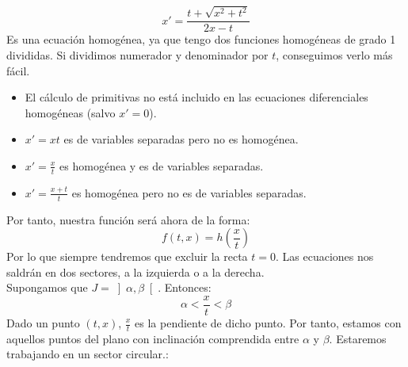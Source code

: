 \begin{ejemplo}
    \begin{equation*}
        x' = \dfrac{t + \sqrt{x^2+t^2}}{2x-t}
    \end{equation*}
    Es una ecuación homogénea, ya que tengo dos funciones homogéneas de grado 1 divididas. Si dividimos numerador y denominador por $t$, conseguimos verlo más fácil.
\end{ejemplo}

\begin{itemize}
    \item El cálculo de primitivas no está incluido en las ecuaciones diferenciales homogéneas (salvo $x' = 0$).
    \item $x' = xt$ es de variables separadas pero no es homogénea.
    \item $x' = \frac{x}{t}$ es homogénea y es de variables separadas.
    \item $x' = \frac{x+t}{t}$ es homogénea pero no es de variables separadas.
\end{itemize}


Por tanto, nuestra función será ahora de la forma:
\begin{equation*}
    f(t,x) = h\left(\dfrac{x}{t}\right)
\end{equation*}
Por lo que siempre tendremos que excluir la recta $t=0$. Las ecuaciones nos saldrán en dos sectores, a la izquierda o a la derecha.\\

Supongamos que $J = \left]\alpha, \beta\right[$. Entonces:
\begin{equation*}
    \alpha < \frac{x}{t} < \beta
\end{equation*}
Dado un punto $(t,x)$, $\frac{x}{t}$ es la pendiente de dicho punto. Por tanto, estamos con aquellos puntos del plano con inclinación comprendida entre $\alpha$ y $\beta$. Estaremos trabajando en un sector circular.:

